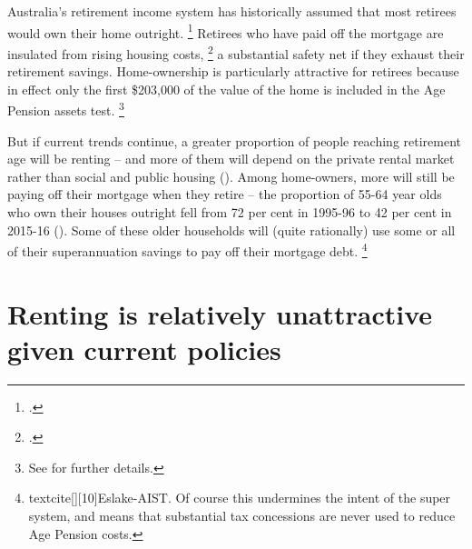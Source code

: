 Australia's retirement income system has historically assumed that most retirees would own their home outright.%
	\footcite{Yates2015}
Retirees who have paid off the mortgage are insulated from rising housing costs,%
	\footcites{Yates2015}{Eslake-AIST}
a substantial safety net if they exhaust their retirement savings.
Home-ownership is particularly attractive for retirees because in effect only the first \$203,000 of the value of the home is included in the Age Pension assets test.%
	\footnote{See  for further details.}


But if current trends continue, a greater proportion of people reaching retirement age will be renting -- and more of them will depend on the private rental market rather than social and public housing ().
Among home-owners, more will still be paying off their mortgage when they retire -- the proportion of 55-64 year olds who own their houses outright fell from 72 per cent in 1995-96 to 42 per cent in 2015-16 ().
Some of these older households will (quite rationally) use some or all of their superannuation savings to pay off their mortgage debt.%
	\footnote{textcite[][10]{Eslake-AIST}. Of course this undermines the intent of the super system, and means that substantial tax concessions are never used to reduce Age Pension costs.}




\section{Renting is relatively unattractive given current policies }\label{sec:renting-is-relatively-unattractive-under-current-policy-settings}

